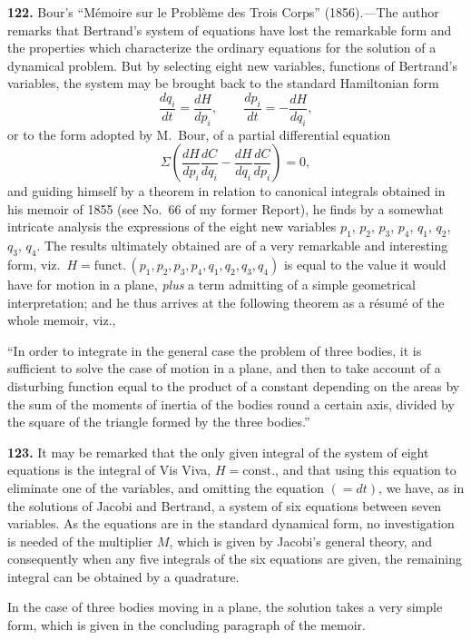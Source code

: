 \documentclass[11pt,a4paper]{article}
\theoremstyle{definition}
\begin{document}
\textbf{122.} Bour's ``M\'emoire sur le Probl\`eme des Trois Corps'' (1856).---The author remarks that Bertrand's system of equations have lost the remarkable form and the properties which characterize the ordinary equations for the solution of a dynamical problem. But by selecting eight new variables, functions of Bertrand's variables, the system may be brought back to the standard Hamiltonian form
\[
\frac{dq_i}{dt} = \frac{dH}{dp_i}, \qquad \frac{dp_i}{dt} = -\frac{dH}{dq_i},
\]
or to the form adopted by M.~Bour, of a partial differential equation
\[
\Sigma\left(\frac{dH}{dp_i}\frac{dC}{dq_i} - \frac{dH}{dq_i}\frac{dC}{dp_i}\right) = 0,
\]
and guiding himself by a theorem in relation to canonical integrals obtained in his memoir of 1855 (see No.~66 of my former Report), he finds by a somewhat intricate analysis the expressions of the eight new variables $p_1$, $p_2$, $p_3$, $p_4$, $q_1$, $q_2$, $q_3$, $q_4$. The results ultimately obtained are of a very remarkable and interesting form, viz.\ $H = \text{funct.}\,(p_1, p_2, p_3, p_4, q_1, q_2, q_3, q_4)$ is equal to the value it would have for motion in a plane, \textit{plus} a term admitting of a simple geometrical interpretation; and he thus arrives at the following theorem as a r\'esum\'e of the whole memoir, viz.,

``In order to integrate in the general case the problem of three bodies, it is sufficient to solve the case of motion in a plane, and then to take account of a disturbing function equal to the product of a constant depending on the areas by the sum of the moments of inertia of the bodies round a certain axis, divided by the square of the triangle formed by the three bodies.''

\textbf{123.} It may be remarked that the only given integral of the system of eight equations is the integral of Vis Viva, $H = \text{const.}$, and that using this equation to eliminate one of the variables, and omitting the equation $(=dt)$, we have, as in the solutions of Jacobi and Bertrand, a system of six equations between seven variables. As the equations are in the standard dynamical form, no investigation is needed of the multiplier $M$, which is given by Jacobi's general theory, and consequently when any five integrals of the six equations are given, the remaining integral can be obtained by a quadrature.

In the case of three bodies moving in a plane, the solution takes a very simple form, which is given in the concluding paragraph of the memoir.
\end{document}
